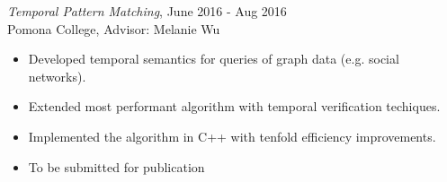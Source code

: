 {\sl Temporal Pattern Matching}, \hfill June 2016 - Aug 2016 \\
Pomona College, Advisor: Melanie Wu
\begin{itemize} \itemsep -2pt
  \item Developed temporal semantics for queries of graph data (e.g. social networks).
  \item Extended most performant algorithm with temporal verification techiques.
  \item Implemented the algorithm in C++ with tenfold efficiency improvements.
  \item To be submitted for publication
\end{itemize}
